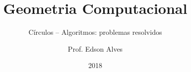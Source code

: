 \title{Geometria Computacional}
\subtitle{Círculos -- Algoritmos: problemas resolvidos}
\date{2018}
\author{Prof. Edson Alves}
